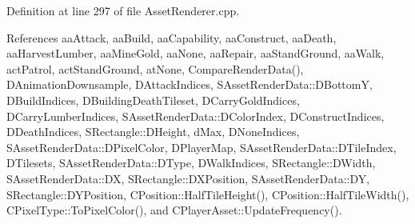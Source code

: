 Definition at line 297 of file Asset\+Renderer.\+cpp.



References aa\+Attack, aa\+Build, aa\+Capability, aa\+Construct, aa\+Death, aa\+Harvest\+Lumber, aa\+Mine\+Gold, aa\+None, aa\+Repair, aa\+Stand\+Ground, aa\+Walk, act\+Patrol, act\+Stand\+Ground, at\+None, Compare\+Render\+Data(), D\+Animation\+Downsample, D\+Attack\+Indices, S\+Asset\+Render\+Data\+::\+D\+BottomY, D\+Build\+Indices, D\+Building\+Death\+Tileset, D\+Carry\+Gold\+Indices, D\+Carry\+Lumber\+Indices, S\+Asset\+Render\+Data\+::\+D\+Color\+Index, D\+Construct\+Indices, D\+Death\+Indices, S\+Rectangle\+::\+D\+Height, d\+Max, D\+None\+Indices, S\+Asset\+Render\+Data\+::\+D\+Pixel\+Color, D\+Player\+Map, S\+Asset\+Render\+Data\+::\+D\+Tile\+Index, D\+Tilesets, S\+Asset\+Render\+Data\+::\+D\+Type, D\+Walk\+Indices, S\+Rectangle\+::\+D\+Width, S\+Asset\+Render\+Data\+::\+DX, S\+Rectangle\+::\+D\+X\+Position, S\+Asset\+Render\+Data\+::\+DY, S\+Rectangle\+::\+D\+Y\+Position, C\+Position\+::\+Half\+Tile\+Height(), C\+Position\+::\+Half\+Tile\+Width(), C\+Pixel\+Type\+::\+To\+Pixel\+Color(), and C\+Player\+Asset\+::\+Update\+Frequency().


